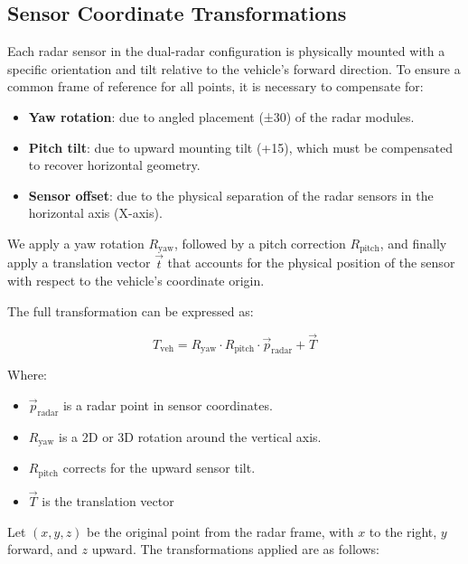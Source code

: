 \subsection{Sensor Coordinate Transformations}
\label{subsec:transformations}

Each radar sensor in the dual-radar configuration is physically mounted with a specific orientation and tilt relative to the vehicle's forward direction. 
To ensure a common frame of reference for all points, it is necessary to compensate for:

\begin{itemize}
    \item \textbf{Yaw rotation}: due to angled placement (±30) of the radar modules.
    \item \textbf{Pitch tilt}: due to upward mounting tilt (+15), which must be compensated to recover horizontal geometry.
    \item \textbf{Sensor offset}: due to the physical separation of the radar sensors in the horizontal axis (X-axis).
\end{itemize}

We apply a yaw rotation \( R_{\text{yaw}} \), followed by a pitch correction \( R_{\text{pitch}} \), and finally apply a translation vector \( \vec{t} \) that accounts for the physical position of the sensor with respect to the vehicle's coordinate origin.

The full transformation can be expressed as:

\begin{equation}
T_{\text{veh}} = R_{\text{yaw}} \cdot R_{\text{pitch}} \cdot \vec{p}_{\text{radar}} + \vec{T}
\label{eq:radar_to_vehicle_transform}
\end{equation}

Where:
\begin{itemize}
    \item \( \vec{p}_{\text{radar}} \) is a radar point in sensor coordinates.
    \item \( R_{\text{yaw}} \) is a 2D or 3D rotation around the vertical axis.
    \item \( R_{\text{pitch}} \) corrects for the upward sensor tilt.
    \item \( \vec{T} \) is the translation vector
\end{itemize}

\vspace{1em}

Let $(x, y, z)$ be the original point from the radar frame, with $x$ to the right, $y$ forward, and $z$ upward. 
The transformations applied are as follows:

